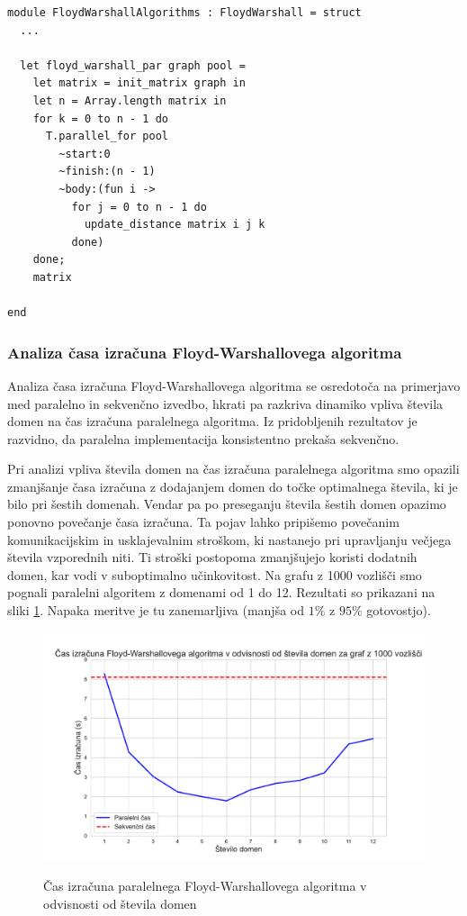 \documentclass[fin1, tisk]{fmfdelo}
\begin{document}
\begin{lstlisting}
module FloydWarshallAlgorithms : FloydWarshall = struct
  ...

  let floyd_warshall_par graph pool =
    let matrix = init_matrix graph in
    let n = Array.length matrix in
    for k = 0 to n - 1 do
      T.parallel_for pool 
        ~start:0 
        ~finish:(n - 1) 
        ~body:(fun i ->
          for j = 0 to n - 1 do
            update_distance matrix i j k
          done)
    done;
    matrix

end
\end{lstlisting}

\subsubsection{Analiza časa izračuna Floyd-Warshallovega algoritma}

Analiza časa izračuna Floyd-Warshallovega algoritma se osredotoča na primerjavo med paralelno in sekvenčno izvedbo, hkrati pa razkriva
dinamiko vpliva števila domen na čas izračuna paralelnega algoritma. Iz pridobljenih rezultatov je razvidno, da paralelna implementacija
konsistentno prekaša sekvenčno.

Pri analizi vpliva števila domen na čas izračuna paralelnega algoritma smo opazili zmanjšanje časa izračuna z dodajanjem domen do točke
optimalnega števila, ki je bilo pri šestih domenah. Vendar pa po preseganju števila šestih domen opazimo ponovno povečanje časa izračuna.
Ta pojav lahko pripišemo povečanim komunikacijskim in usklajevalnim stroškom, ki nastanejo pri upravljanju večjega števila vzporednih niti.
Ti stroški postopoma zmanjšujejo koristi dodatnih domen, kar vodi v suboptimalno učinkovitost.
Na grafu z 1000 vozlišči smo pognali paralelni algoritem z domenami od 1 do 12. Rezultati so prikazani na sliki \ref{fig:floyd_v_odvisnosti_od_stevila_domen}.
Napaka meritve je tu zanemarljiva (manjša od $1\%$ z $95\%$ gotovostjo).


\begin{figure}[h!]
  \centering
  \caption{Čas izračuna paralelnega Floyd-Warshallovega algoritma v odvisnosti od števila domen}
  \includegraphics[width=15cm]{slike/floyd_v_odvisnosti_od_stevila_domen.pdf}
  \label{fig:floyd_v_odvisnosti_od_stevila_domen}
\end{figure}
\end{document}
